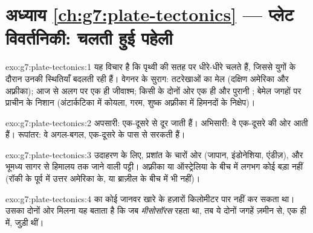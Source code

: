 \section*{अध्याय \ref{ch:g7:plate-tectonics} --- प्लेट विवर्तनिकी: चलती हुई पहेली}

\begin{solution}{exo:g7:plate-tectonics:1}
 यह विचार है कि  पृथ्वी की सतह पर धीरे-धीरे चलते
हैं, जिससे युगों के दौरान उनकी स्थितियाँ बदलती रही हैं। वेगनर के सुराग:
तटरेखाओं का मेल (दक्षिण अमेरिका और अफ़्रीका); आज  से अलग  पर
एक ही जीवाश्म; किसी  के दोनों ओर एक ही  और पुरानी
; बेमेल जगहों पर प्राचीन  के निशान (अंटार्कटिका में कोयला,
गरम, शुष्क अफ़्रीका में हिमनदों के निक्षेप)।
\end{solution}

\begin{solution}{exo:g7:plate-tectonics:2}
अपसारी:  एक-दूसरे से दूर जाती हैं। अभिसारी: वे एक-दूसरे की ओर आती
हैं। रूपांतर: वे अगल-बगल, एक-दूसरे के पास से सरकती हैं।
\end{solution}

\begin{solution}{exo:g7:plate-tectonics:3}
उदाहरण के लिए, प्रशांत  के चारों ओर (जापान, इंडोनेशिया, एंडीज़), और
भूमध्य सागर से हिमालय तक जाने वाली पट्टी। अफ़्रीका या ऑस्ट्रेलिया के बीच में
लगभग कोई बड़ा  नहीं (रॉकी  के पूर्व में उत्तर अमेरिका के, या
ब्राज़ील के बीच में भी नहीं)।
\end{solution}

\begin{solution}{exo:g7:plate-tectonics:4}
 का कोई जानवर खारे  के हज़ारों किलोमीटर पार नहीं कर सकता था।
उसका दोनों ओर मिलना यह बताता है कि जब \emph{मीसोसॉरस} रहता था, तब ये दोनों
जगहें ज़मीन से, एक ही  में, जुड़ी थीं।
\end{solution}

